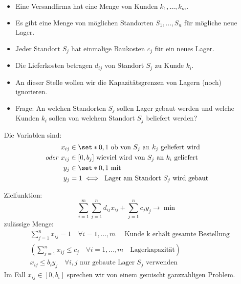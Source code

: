 \begin{beispiel}\enter
  \begin{itemize}[nosep]
    \item Eine Versandfirma hat eine Menge von Kunden $k_{1},\dots,k_{m}$.
	  \item Es gibt eine Menge von möglichen Standorten $S_{1},\dots, S_{n}$ für mögliche neue Lager.
    \item Jeder Standort $S_j$ hat einmalige Baukosten $c_{j}$ für ein neues Lager.
    \item Die Lieferkosten betragen $d_{ij}$ von Standort $S_{j}$ zu Kunde $k_{i}$.
    \item An dieser Stelle wollen wir die Kapazitätsgrenzen von Lagern (noch) ignorieren.
	  \item Frage: An welchen Standorten $S_{j}$ sollen Lager gebaut werden und welche Kunden $k_{i}$ sollen von welchem Standort $S_{j}$ beliefert werden?
  \end{itemize}
	Die Variablen sind:
	\begin{align*}
    x_{ij}&\in \set*{0,1} \text{ ob von $S_j$ an $k_j$ geliefert wird}\\
    \text{\emph{oder} } x_{ij} & \in [0,b_j] \text{ wieviel wird von $S_{j}$ an $k_{i}$ geliefert}\\
		y_{j} &\in \set*{0,1}\text{ mit }  \\
		y_{j}& = 1 \iff \text{ Lager am Standort $S_{j}$ wird gebaut}
	\end{align*}

	Zielfunktion:
	\begin{equation*}
		\sum_{i=1}^{m} \sum_{j=1}^{n}  d_{ij}x_{ij} + \sum_{j=1}^{n} c_{j}y_{j} \rightarrow \min
	\end{equation*}
	zulässige Menge:	
	\begin{align*}
		&\sum_{j=1}^{n} x_{ij} =1 \quad \forall i=1,\dots, m\quad \text{ Kunde k erhält gesamte Bestellung}\\
		&\left(\sum_{j=1}^{n} x_{ij} \leq c_{j} \quad \forall i=1,\dots, m \quad \text{Lagerkapazität}\right)\\
		&x_{ij} \leq b_{i}y_{j} \quad \forall i,j \text{ nur gebaute Lager $S_{j}$ verwenden}
	\end{align*}
	Im Fall $x_{ij} \in [0,b_{i}]$ sprechen wir von einem gemischt ganzzahligen Problem.
\end{beispiel}

